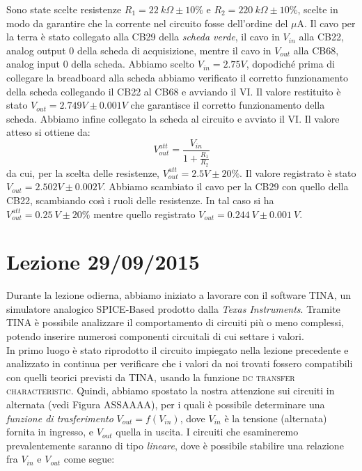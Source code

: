 \documentclass[journal, a4paper]{IEEEtran}
\begin{document}
Sono state scelte resistenze $R_1 = 22 ~ k\Omega \pm 10 \%$ e $R_2 = 220~ k\Omega \pm 10 \%$, scelte in modo da garantire che la corrente nel circuito fosse dell'ordine del $\mu$A. Il cavo per la terra è stato collegato alla CB29 della \textit{scheda verde}, il cavo in $V_{in}$ alla CB22, analog output 0 della scheda di acquisizione, mentre il cavo in $V_{out}$ alla CB68, analog input 0 della scheda. Abbiamo scelto $V_{in} = 2.75 V$, dopodiché prima di collegare la breadboard alla scheda abbiamo verificato il corretto funzionamento della scheda collegando il CB22 al CB68 e avviando il VI. Il valore restituito è stato $V_{out} = 2.749 V \pm 0.001 V$ che garantisce il corretto funzionamento della scheda. Abbiamo infine collegato la scheda al circuito e avviato il VI. Il valore atteso si ottiene da:
\begin{equation}
V_{out}^{att}= \frac{V_{in}}{1+\frac{R_1}{R_2}}
\end{equation}
da cui, per la scelta delle resistenze, $V_{out}^{att} = 2.5 V \pm 20 \%$. Il valore registrato è stato $V_{out} = 2.502 V \pm 0.002 V$. Abbiamo scambiato il cavo per la CB29 con quello della CB22, scambiando così i ruoli delle resistenze. In tal caso si ha $V_{out}^{att} = 0.25~ V \pm 20 \%$ mentre quello registrato $V_{out} = 0.244 ~V \pm 0.001 ~V$.

\section{Lezione 29/09/2015}
Durante la lezione odierna, abbiamo iniziato a lavorare con il software TINA, un simulatore analogico SPICE-Based prodotto dalla \textit{Texas Instruments}. Tramite TINA è possibile analizzare il comportamento di circuiti più o meno complessi, potendo inserire numerosi componenti circuitali di cui settare i valori. \\
In primo luogo è stato riprodotto il circuito impiegato nella lezione precedente e analizzato in continua per verificare che i valori da noi trovati fossero compatibili con quelli teorici previsti da TINA, usando la funzione \textsc{dc transfer characteristic}.
Quindi, abbiamo spostato la nostra attenzione sui circuiti in alternata (vedi Figura ASSAAAA), per i quali è possibile determinare una \textit{funzione di trasferimento} $V_{out} = f(V_{in})$, dove $V_{in}$ è la tensione (alternata) fornita in ingresso, e $V_{out}$ quella in uscita.
I circuiti che esamineremo prevalentemente saranno di tipo \textit{lineare}, dove è possibile stabilire una relazione fra $V_{in}$ e $V_{out}$ come segue:
\end{document}
